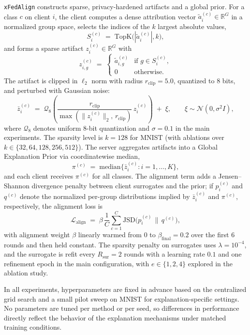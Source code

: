 \documentclass{article}
\theoremstyle{plain}
\theoremstyle{definition}
\theoremstyle{remark}
\begin{document}
\texttt{xFedAlign} constructs sparse, privacy-hardened artifacts and a global prior. For a class $c$ on client $i$, the client computes a dense attribution vector $\tilde{a}_i^{(c)}\in\mathbb{R}^{G}$ in a normalized group space, selects the indices of the $k$ largest absolute values,
\[
S_i^{(c)} \;=\; \mathrm{TopK}\big(|\tilde{a}_i^{(c)}|, k\big),
\]
and forms a sparse artifact $z_i^{(c)}\in\mathbb{R}^{G}$ with
\[
z_{i,g}^{(c)} \;=\;
\begin{cases}
\tilde{a}_{i,g}^{(c)} & \text{if } g\in S_i^{(c)}, \\
0 & \text{otherwise}.
\end{cases}
\]
The artifact is clipped in $\ell_2$ norm with radius $r_{\text{clip}}{=}5.0$, quantized to $8$ bits, and perturbed with Gaussian noise:
\[
\bar{z}_i^{(c)} \;=\; \mathcal{Q}_{8}\!\left(
\frac{r_{\text{clip}}}{\max(\|z_i^{(c)}\|_2,\,r_{\text{clip}})}\,z_i^{(c)} 
\right) \;+\; \xi, 
\qquad \xi \sim \mathcal{N}(0,\sigma^2 I),
\]
where $\mathcal{Q}_{8}$ denotes uniform 8-bit quantization and $\sigma{=}0.1$ in the main experiments. The sparsity level is $k{=}128$ for MNIST (with ablations over $k\in\{32,64,128,256,512\}$). The server aggregates artifacts into a Global Explanation Prior via coordinatewise median,
\[
\pi^{(c)} \;=\; \mathrm{median}\big\{ \bar{z}_i^{(c)} : i=1,\dots,K \big\},
\]
and each client receives $\pi^{(c)}$ for all classes. The alignment term adds a Jensen–Shannon divergence penalty between client surrogates and the prior; if $p_i^{(c)}$ and $q^{(c)}$ denote the normalized per-group distributions implied by $\bar{z}_i^{(c)}$ and $\pi^{(c)}$, respectively, the alignment loss is
\[
\mathcal{L}_{\text{align}} \;=\; 
\beta\, \frac{1}{C}\sum_{c=1}^{C} \mathrm{JSD}\big(p_i^{(c)} \,\|\, q^{(c)}\big),
\]
with alignment weight $\beta$ linearly warmed from $0$ to $\beta_{\text{final}}{=}0.2$ over the first $6$ rounds and then held constant. The sparsity penalty on surrogates uses $\lambda = 10^{-4}$, and the surrogate is refit every $R_{\text{sur}}{=}2$ rounds with a learning rate $0.1$ and one refinement epoch in the main configuration, with $e\in\{1,2,4\}$ explored in the ablation study.

In all experiments, hyperparameters are fixed in advance based on the centralized grid search and a small pilot sweep on MNIST for explanation-specific settings. No parameters are tuned per method or per seed, so differences in performance directly reflect the behavior of the explanation mechanisms under matched training conditions.
\end{document}
